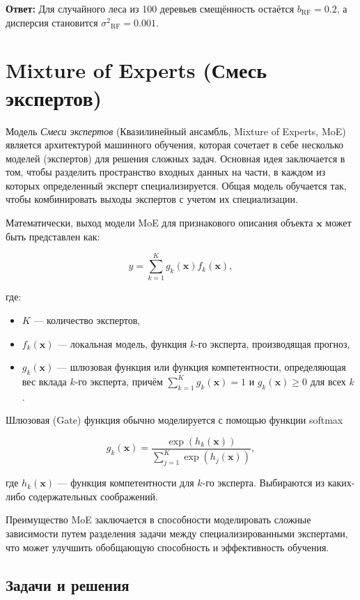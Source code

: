 \textbf{Ответ:} Для случайного леса из 100 деревьев смещённость остаётся \(b_{\text{RF}}=0.2\), а дисперсия становится \({\sigma^2}_{\text{RF}}=0.001\).



\section{Mixture of Experts (Смесь экспертов)}

Модель \textit{Смеси экспертов} (Квазилинейный ансамбль, Mixture of Experts, MoE) является архитектурой машинного обучения, которая сочетает в себе несколько моделей (экспертов) для решения сложных задач. Основная идея заключается в том, чтобы разделить пространство входных данных на части, в каждом из которых определенный эксперт специализируется. Общая модель обучается так, чтобы комбинировать выходы экспертов с учетом их специализации.

Математически, выход модели MoE для признакового описания объекта $\mathbf{x}$ может быть представлен как:

$$
    y = \sum_{k=1}^{K} g_k(\mathbf{x}) f_k(\mathbf{x}),
$$

где:
\begin{itemize}
    \item $K$ — количество экспертов,
    \item $f_k(\mathbf{x})$ — локальная модель, функция $k$-го эксперта, производящая прогноз,
    \item $g_k(\mathbf{x})$ — шлюзовая функция или функция компетентности, определяющая вес вклада $k$-го эксперта, причём $\sum_{k=1}^{K} g_k(\mathbf{x}) = 1$ и $g_k(\mathbf{x}) \geq 0$ для всех $k$.
\end{itemize}

Шлюзовая (Gate) функция обычно моделируется с помощью функции softmax

$$
    g_k(\mathbf{x}) = \frac{\exp(h_k(\mathbf{x}))}{\sum_{j=1}^{K} \exp(h_j(\mathbf{x}))},
$$

где $h_k(\mathbf{x})$ — функция компетентности для $k$-го эксперта. Выбираются из каких-либо содержательных соображений.

Преимущество MoE заключается в способности моделировать сложные зависимости путем разделения задачи между специализированными экспертами, что может улучшить обобщающую способность и эффективность обучения.

\subsection{Задачи и решения}

